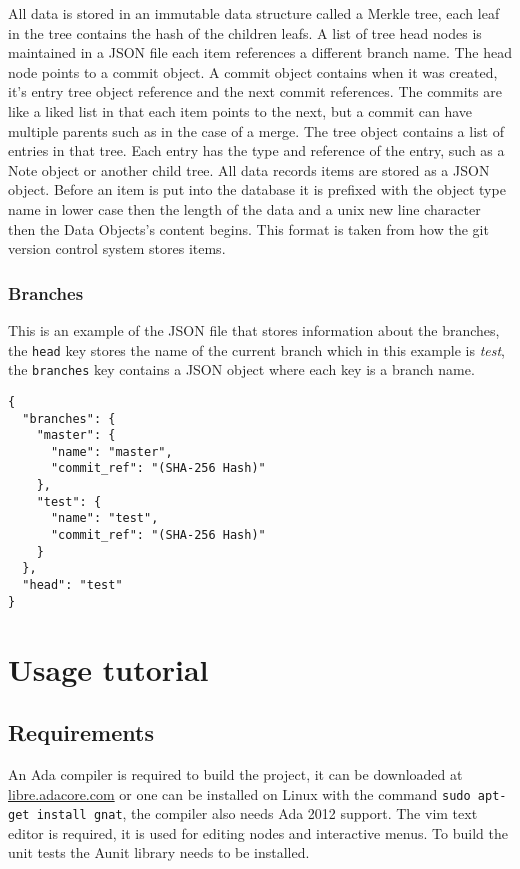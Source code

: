 \documentclass[12pt,a4paper]{article}
\newcommand{\codetext}[1]{\colorbox{light-gray}{\texttt{#1}}}
\begin{document}
\par All data is stored in an immutable data structure called a Merkle tree,
each leaf in the tree contains the hash of the children leafs. A list of tree
head nodes is maintained in a JSON file each item references a different branch
name. The head node points to a commit object. A commit object contains when it
was created, it's entry tree object reference and the next commit references. The
commits are like a liked list in that each item points to the next, 
but a commit can have multiple parents such as in the case of a merge. The tree
object contains a list of entries in that tree. Each entry has the type and
reference of the entry, such as a Note object or another child tree. All data
records items are stored as a JSON object. Before an item is put into the
database it is prefixed with the object type name in lower case then the length
of the data and a unix new line character then the Data Objects's content
begins. This format is taken from how the git version control system stores
items.

\subsubsection{Branches}
This is an example of the JSON file that stores information about the branches,
the \codetext{head} key stores the name of the current branch which in this
example is \textit{test}, the \codetext{branches} key contains a JSON object
where each key is a branch name.

\begin{verbatim}
{
  "branches": {
    "master": {
      "name": "master",
      "commit_ref": "(SHA-256 Hash)"
    },
    "test": {
      "name": "test",
      "commit_ref": "(SHA-256 Hash)"
    }
  },
  "head": "test"
}
\end{verbatim}



\section{Usage tutorial}
\subsection{Requirements}
An Ada compiler is required to build the project, it can be downloaded at
\href{http://libre.adacore.com/}{libre.adacore.com} or one can be installed on
Linux with the command \codetext{sudo apt-get install gnat}, the compiler also
needs Ada 2012 support. The vim text editor is required, it is used for editing
nodes and interactive menus. To build the unit tests the Aunit library needs to be installed.
\end{document}
